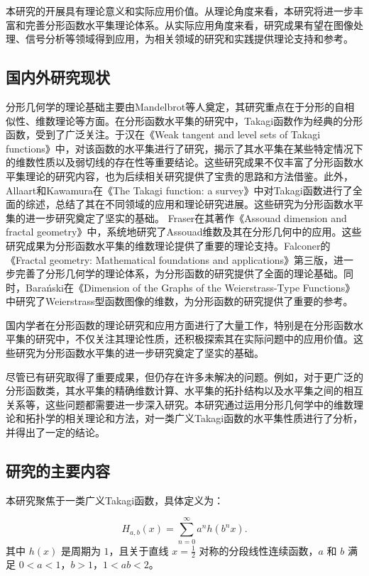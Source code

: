 本研究的开展具有理论意义和实际应用价值。从理论角度来看，本研究将进一步丰富和完善分形函数水平集理论体系。从实际应用角度来看，研究成果有望在图像处理、信号分析等领域得到应用，为相关领域的研究和实践提供理论支持和参考。

\subsection{国内外研究现状}

分形几何学的理论基础主要由Mandelbrot等人奠定，其研究重点在于分形的自相似性、维数理论等方面。在分形函数水平集的研究中，Takagi函数作为经典的分形函数，受到了广泛关注。于汉在《Weak tangent and level sets of Takagi functions》中，对该函数的水平集进行了研究，揭示了其水平集在某些特定情况下的维数性质以及弱切线的存在性等重要结论。这些研究成果不仅丰富了分形函数水平集理论的研究内容，也为后续相关研究提供了宝贵的思路和方法借鉴。此外，Allaart和Kawamura在《The Takagi function: a survey》中对Takagi函数进行了全面的综述，总结了其在不同领域的应用和理论研究进展。这些研究为分形函数水平集的进一步研究奠定了坚实的基础。
Fraser在其著作《Assouad dimension and fractal geometry》\cite{9}中，系统地研究了Assouad维数及其在分形几何中的应用。这些研究成果为分形函数水平集的维数理论提供了重要的理论支持。Falconer的《Fractal geometry: Mathematical foundations and applications》\cite{7}第三版，进一步完善了分形几何学的理论体系，为分形函数的研究提供了全面的理论基础。同时，Bara\'nski在《Dimension of the Graphs of the Weierstrass-Type Functions》\cite{4}中研究了Weierstrass型函数图像的维数，为分形函数的研究提供了重要的参考。

国内学者在分形函数的理论研究和应用方面进行了大量工作，特别是在分形函数水平集的研究中，不仅关注其理论性质，还积极探索其在实际问题中的应用价值。这些研究为分形函数水平集的进一步研究奠定了坚实的基础。

尽管已有研究取得了重要成果，但仍存在许多未解决的问题。例如，对于更广泛的分形函数类，其水平集的精确维数计算、水平集的拓扑结构以及水平集之间的相互关系等，这些问题都需要进一步深入研究。本研究通过运用分形几何学中的维数理论和拓扑学的相关理论和方法，对一类广义Takagi函数的水平集性质进行了分析，并得出了一定的结论。

\subsection{研究的主要内容}

本研究聚焦于一类广义Takagi函数，具体定义为：

\[
H_{a,b}(x) = \sum_{n=0}^\infty a^n h(b^n x).
\]
其中 \( h(x) \) 是周期为 \( 1 \)，且关于直线 \( x = \frac{1}{2} \) 对称的分段线性连续函数，\( a \) 和 \( b \) 满足 \( 0 < a < 1 \)，\( b > 1 \)，\( 1 < ab < 2 \)。

